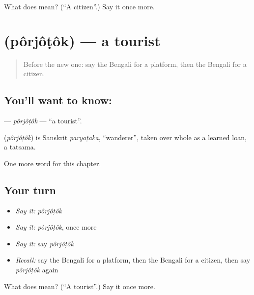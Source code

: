 \begin{tcolorbox}[breakable,colback=teal!4,colframe=teal!35!black,title={Before you move on}]
What does  mean? (\textquotedblleft{}A citizen\textquotedblright{}.) Say it once more.
\end{tcolorbox}
\section[\texorpdfstring{\bn{পর্যটক} (pôrjôṭôk)}{পর্যটক (pôrjôṭôk)}]{ (pôrjôṭôk) — a tourist}

\label{lesson:BN-C199-porjotok}



\begin{quote}
Before the new one: say the Bengali for a platform, then the Bengali for a citizen.
\end{quote}

\subsection*{You'll want to know: }
\textbf{} — \emph{pôrjôṭôk} — \textquotedblleft{}a tourist\textquotedblright{}.

\begin{cousinweb}
\textbf{} (\emph{pôrjôṭôk}) is Sanskrit \emph{paryaṭaka}, \textquotedblleft{}wanderer\textquotedblright{}, taken over whole as a learned loan, a tatsama.
\end{cousinweb}

\begin{grammarlens}[title={What you've built}]
One more word for this chapter.
\end{grammarlens}

\subsection*{Your turn}
\begin{itemize}
\raggedright
  \item \emph{Say it:} \emph{pôrjôṭôk}
  \item \emph{Say it:} \emph{pôrjôṭôk}, once more
  \item \emph{Say it:} say \emph{pôrjôṭôk}
  \item \emph{Recall:} say the Bengali for a platform, then the Bengali for a citizen, then say \emph{pôrjôṭôk} again
\end{itemize}

\begin{tcolorbox}[breakable,colback=teal!4,colframe=teal!35!black,title={Before you move on}]
What does  mean? (\textquotedblleft{}A tourist\textquotedblright{}.) Say it once more.
\end{tcolorbox}

